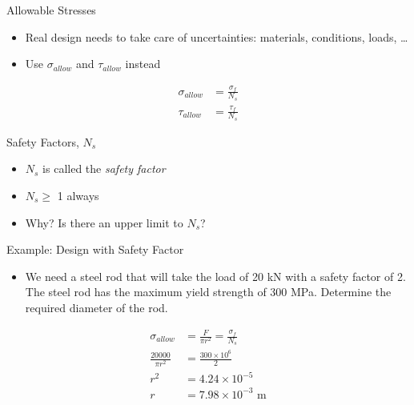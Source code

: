 \documentclass[10pt, svgnames]{beamer}
\begin{document}
\begin{frame}[label={sec:org67935ef}]{Allowable Stresses}
\begin{itemize}
\item Real design needs to take care of uncertainties: materials,
conditions, loads, \ldots{}

\item Use \(\sigma_{allow}\) and \(\tau_{allow}\) instead
\end{itemize}

\begin{align*}
  \sigma_{allow} &= \frac{\sigma_{f}}{N_{s}} \\
  \tau_{allow} &= \frac{\tau_{f}}{N_{s}}
\end{align*}
\end{frame}

\begin{frame}[label={sec:orgf4262fa}]{Safety Factors, \(N_{s}\)}
\begin{itemize}
\item \(N_{s}\) is called the \emph{safety factor}

\item \(N_{s} \geqslant\) 1 always

\item Why? Is there an upper limit to \(N_{s}\)?
\end{itemize}
\end{frame}

\begin{frame}[label={sec:org4546223}]{Example: Design with Safety Factor}
\begin{itemize}
\item We need a steel rod that will take the load of 20 kN with a safety
factor of 2. The steel rod has the maximum yield strength of 300 MPa.
Determine the required diameter of the rod.
\end{itemize}

\begin{align*}
    \sigma_{allow} &= \frac{F}{\pi r^{2}} = \frac{\sigma_{f}}{N_{s}} \\
    \frac{20000}{\pi r^{2}} &= \frac{300 \times 10^{6}}{2} \\
    r^{2} &= 4.24 \times 10^{-5} \\
    r &= 7.98 \times 10^{-3} \text{ m}
\end{align*}
\end{frame}
\end{document}
